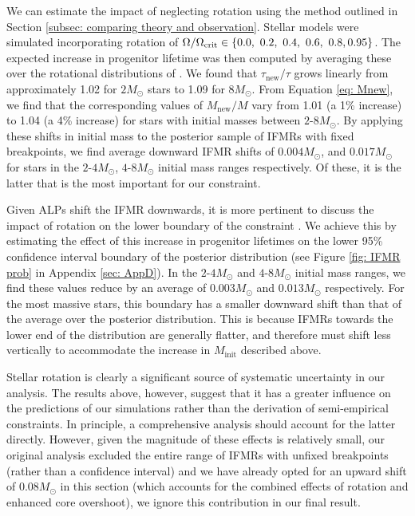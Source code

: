 We can estimate the impact of neglecting rotation using the method outlined in Section \ref{subsec: comparing theory and observation}. Stellar models were simulated incorporating rotation of $\Omega/\Omega_{\mathrm{crit}}\in\{0.0,\ 0.2,\ 0.4,\ 0.6,\ 0.8,\\ 0.95\}$. The expected increase in progenitor lifetime was then computed by averaging these over the rotational distributions of \cite{Huang2010}. We found that $\tau_{\mathrm{new}}/\tau$ grows linearly from approximately 1.02 for $2M_{\odot}$ stars to 1.09 for $8M_{\odot}$. From Equation \ref{eq: Mnew}, we find that the corresponding values of $M_{\mathrm{new}}/M$ vary from 1.01 (a 1\% increase) to 1.04 (a 4\% increase) for stars with initial masses between $2$-$8M_{\odot}$. By applying these shifts in initial mass to the posterior sample of IFMRs with fixed breakpoints, we find average downward IFMR shifts of $0.004M_{\odot}$, and $0.017M_{\odot}$ for stars in the $2$-$4M_{\odot}$, $4$-$8M_{\odot}$ initial mass ranges respectively. Of these, it is the latter that is the most important for our constraint.


Given ALPs shift the IFMR downwards, it is more pertinent to discuss the impact of rotation on the lower boundary of the constraint \cite{Andrews}. We achieve this by estimating the effect of this increase in progenitor lifetimes on the lower 95\% confidence interval boundary of the posterior distribution (see Figure \ref{fig: IFMR prob} in Appendix \ref{sec: AppD}). In the $2$-$4M_{\odot}$ and $4$-$8M_{\odot}$ initial mass ranges, we find these values reduce by an average of $0.003M_{\odot}$ and $0.013M_{\odot}$ respectively. For the most massive stars, this boundary has a smaller downward shift than that of the average over the posterior distribution. This is because IFMRs towards the lower end of the distribution are generally flatter, and therefore must shift less vertically to accommodate the increase in $M_{\mathrm{init}}$ described above.


Stellar rotation is clearly a significant source of systematic uncertainty in our analysis. The results above, however, suggest that it has a greater influence on the predictions of our simulations rather than the derivation of semi-empirical constraints. In principle, a comprehensive analysis should account for the latter directly. However, given the magnitude of these effects is relatively small, our original analysis excluded the entire range of IFMRs with unfixed breakpoints (rather than a confidence interval) and we have already opted for an upward shift of $0.08M_{\odot}$ in this section (which accounts for the combined effects of rotation and enhanced core overshoot), we ignore this contribution in our final result.

